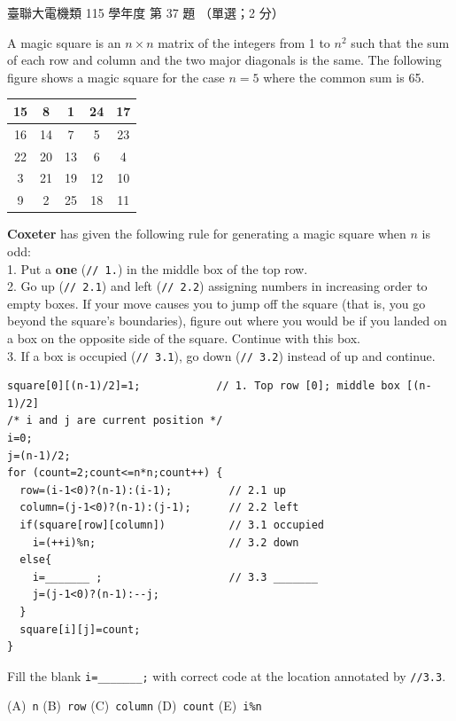\begin{pastexam}[label={px:ust-115-ee-ds-37}]{臺聯大電機類 115 學年度 第 37 題}
（單選；2 分）

A magic square is an $n\times n$ matrix of the integers from 1 to $n^2$ such that the sum of each
row and column and the two major diagonals is the same. The following figure shows a magic square
for the case $n=5$ where the common sum is 65.

\begin{center}
\begin{tabular}{|c|c|c|c|c|}\hline
15 & 8 & 1 & 24 & 17\\\hline
16 & 14 & 7 & 5 & 23\\\hline
22 & 20 & 13 & 6 & 4\\\hline
3 & 21 & 19 & 12 & 10\\\hline
9 & 2 & 25 & 18 & 11\\\hline
\end{tabular}
\end{center}

\textbf{Coxeter} has given the following rule for generating a magic square when $n$ is odd:\\
1. Put a \textbf{one} (\texttt{// 1.}) in the middle box of the top row.\\
2. Go up (\texttt{// 2.1}) and left (\texttt{// 2.2}) assigning numbers in increasing order to
empty boxes. If your move causes you to jump off the square (that is, you go beyond the square's
boundaries), figure out where you would be if you landed on a box on the opposite side of the
square. Continue with this box.\\
3. If a box is occupied (\texttt{// 3.1}), go down (\texttt{// 3.2}) instead of up and continue.
\begin{verbatim}
square[0][(n-1)/2]=1;            // 1. Top row [0]; middle box [(n-1)/2]
/* i and j are current position */
i=0;
j=(n-1)/2;
for (count=2;count<=n*n;count++) {
  row=(i-1<0)?(n-1):(i-1);         // 2.1 up
  column=(j-1<0)?(n-1):(j-1);      // 2.2 left
  if(square[row][column])          // 3.1 occupied
    i=(++i)%n;                     // 3.2 down
  else{
    i=_______ ;                    // 3.3 _______
    j=(j-1<0)?(n-1):--j;
  }
  square[i][j]=count;
}
\end{verbatim}
Fill the blank \texttt{i=\_\_\_\_\_\_\_;} with correct code at the location annotated by
\texttt{//3.3}.

(A)~\texttt{n} \qquad (B)~\texttt{row} \qquad (C)~\texttt{column} \qquad (D)~\texttt{count}
\qquad (E)~\texttt{i\%n}
\end{pastexam}

